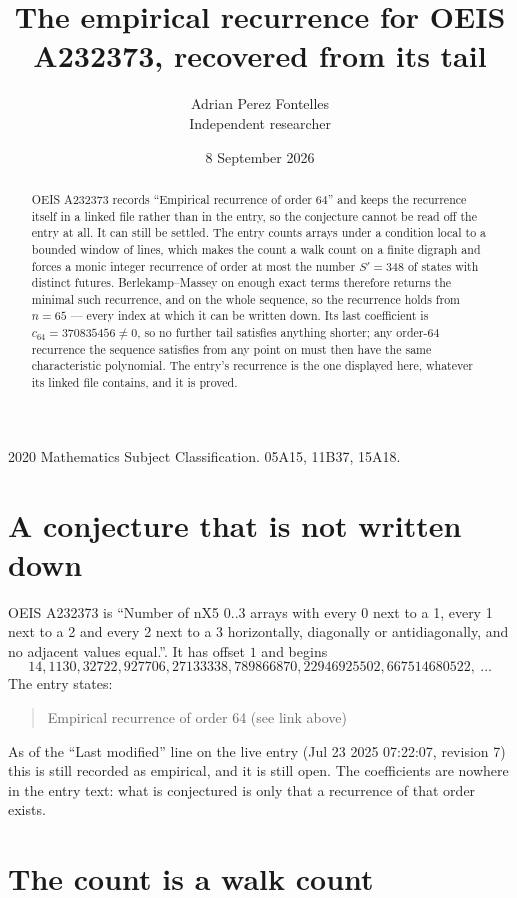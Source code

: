\documentclass[11pt,a4paper]{article}
\title{The empirical recurrence for OEIS A232373, recovered from its tail}
\author{Adrian Perez Fontelles\\ \small Independent researcher}
\date{8 September 2026}
\theoremstyle{plain}
\theoremstyle{definition}
\begin{document}
\maketitle

\begin{abstract}
OEIS A232373 records ``Empirical recurrence of order $64$'' and keeps the recurrence itself in
a linked file rather than in the entry, so the conjecture cannot be read off the entry at all.
It can still be settled. The entry counts arrays under a condition local to a bounded window of
lines, which makes the count a walk count on a finite digraph and forces a monic integer
recurrence of order at most the number $S'=348$ of states with distinct futures. Berlekamp--Massey on
enough exact terms therefore returns the minimal such recurrence, and on the whole sequence, so the recurrence holds from $n=65$ --- every index at which it can be written down.
Its last coefficient is $c_{64}=370835456\neq0$, so no further tail satisfies anything
shorter; any order-$64$ recurrence the sequence satisfies from any point on must then have
the same characteristic polynomial. The entry's recurrence is the one displayed here, whatever
its linked file contains, and it is proved.
\end{abstract}

\noindent\small 2020 Mathematics Subject Classification. 05A15, 11B37, 15A18.\normalsize

\section{A conjecture that is not written down}

OEIS A232373 is ``Number of nX5 0..3 arrays with every 0 next to a 1, every 1 next to a 2 and every 2 next to a 3 horizontally, diagonally or antidiagonally, and no adjacent values equal.''. It has offset $1$ and begins
\[
14, 1130, 32722, 927706, 27133338, 789866870, 22946925502, 667514680522,\ \dots
\]
The entry states:
\begin{quote}
Empirical recurrence of order 64 (see link above)
\end{quote}
As of the ``Last modified'' line on the live entry (Jul 23 2025 07:22:07, revision 7)
this is still recorded as empirical, and it is still open. The coefficients are nowhere in the
entry text: what is conjectured is only that a recurrence of that order exists.

\section{The count is a walk count}
\end{document}

